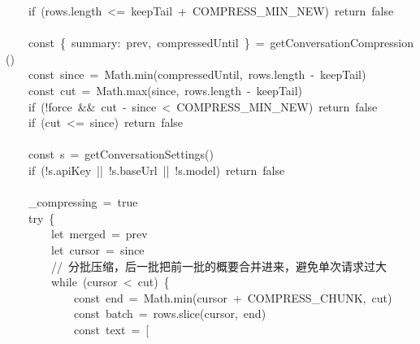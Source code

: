 \documentclass[a4paper,10pt]{article}
\begin{document}
{~~~~if~(rows.length~<=~keepTail~+~COMPRESS\_MIN\_NEW)~return~false\\
\mbox{}\\
~~~~const~\{~summary:~prev,~compressedUntil~\}~=~getConversationCompression()\\
~~~~const~since~=~Math.min(compressedUntil,~rows.length~-~keepTail)\\
~~~~const~cut~=~Math.max(since,~rows.length~-~keepTail)\\
~~~~if~(!force~\&\&~cut~-~since~<~COMPRESS\_MIN\_NEW)~return~false\\
~~~~if~(cut~<=~since)~return~false\\
\mbox{}\\
~~~~const~s~=~getConversationSettings()\\
~~~~if~(!s.apiKey~||~!s.baseUrl~||~!s.model)~return~false\\
\mbox{}\\
~~~~\_compressing~=~true\\
~~~~try~\{\\
~~~~~~~~let~merged~=~prev\\
~~~~~~~~let~cursor~=~since\\
~~~~~~~~//~分批压缩，后一批把前一批的概要合并进来，避免单次请求过大\\
~~~~~~~~while~(cursor~<~cut)~\{\\
~~~~~~~~~~~~const~end~=~Math.min(cursor~+~COMPRESS\_CHUNK,~cut)\\
~~~~~~~~~~~~const~batch~=~rows.slice(cursor,~end)\\
~~~~~~~~~~~~const~text~=~[
}

\newpage
\end{document}
